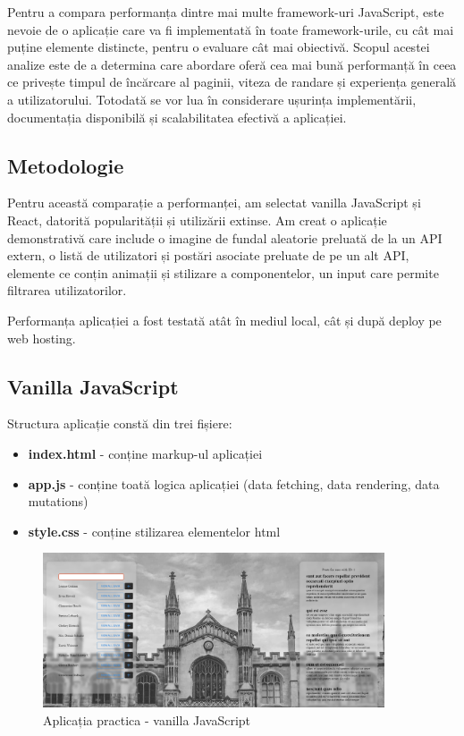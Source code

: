\documentclass[12pt, a4paper]{report}
\begin{document}
Pentru a compara performanța dintre mai multe framework-uri JavaScript, este nevoie de o aplicație care va fi implementată în toate framework-urile, cu cât mai puține elemente distincte, pentru o evaluare cât mai obiectivă. Scopul acestei analize este de a determina care abordare oferă cea mai bună performanță în ceea ce privește timpul de încărcare al paginii, viteza de randare și experiența generală a utilizatorului. Totodată se vor lua în considerare ușurința implementării, documentația disponibilă și scalabilitatea efectivă a aplicației.

\subsection{Metodologie}

Pentru această comparație a performanței, am selectat vanilla JavaScript și React, datorită popularității și utilizării extinse. Am creat o aplicație demonstrativă care include o imagine de fundal aleatorie preluată de la un API extern, o listă de utilizatori și postări asociate preluate de pe un alt API, elemente ce conțin animații și stilizare a componentelor, un input care permite filtrarea utilizatorilor.

Performanța aplicației a fost testată atât în mediul local, cât și după deploy pe web hosting.

\subsection{Vanilla JavaScript}
Structura aplicație constă din trei fișiere:
\begin{itemize}
	\item \textbf{index.html} - conține markup-ul aplicației
	\item \textbf{app.js} - conține toată logica aplicației (data fetching, data rendering, data mutations)
	\item \textbf{style.css} - conține stilizarea elementelor html
\end{itemize}

\begin{figure}[htbp]
	\centering
	\includegraphics[width=0.9\textwidth]{01_desktop_preview.png}
	\caption{Aplicația practica - vanilla JavaScript}
	\label{fig:preview-vanillajs}
\end{figure}
\end{document}
